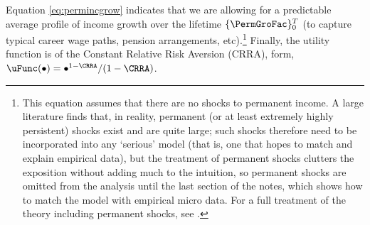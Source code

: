 \documentclass[titlepage, headings=optiontotocandhead]{\econtex}
\begin{document}
Equation \eqref{eq:permincgrow} indicates that we are allowing for a predictable average profile of income growth over the lifetime $\{\PermGroFac\}_{0}^{T}$ (to capture typical career wage paths, pension arrangements, etc).\footnote{This equation assumes that there are no shocks to permanent income.  A large literature finds that, in reality, permanent (or at least extremely highly persistent) shocks exist and are quite large; such shocks therefore need to be incorporated into any `serious' model (that is, one that hopes to match and explain empirical data), but the treatment of permanent shocks clutters the exposition without adding much to the intuition, so permanent shocks are omitted from the analysis until the last section of the notes, which shows how to match the model with empirical micro data.  For a full treatment of the theory including permanent shocks, see \cite{BufferStockTheory}.}  %
Finally, the utility function is of the
Constant Relative Risk Aversion (CRRA), form, $\uFunc(\bullet) = \bullet^{1-\CRRA}/(1-\CRRA)$.
\end{document}
